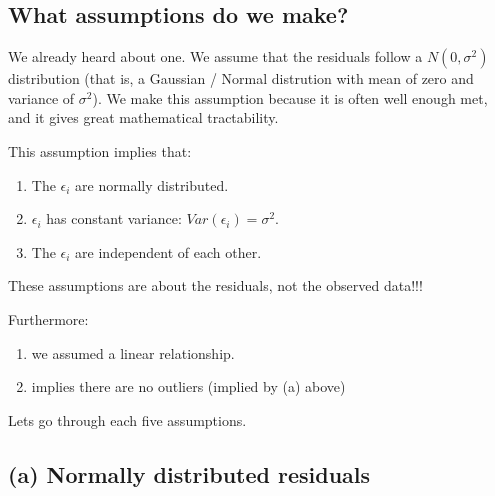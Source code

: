 \documentclass[
  letterpaper,
  8pt,
  a4paper]{book}
\providecommand{\tightlist}{%
  \setlength{\itemsep}{0pt}\setlength{\parskip}{0pt}}
\begin{document}
\subsection*{What assumptions do we
make?}\label{what-assumptions-do-we-make}

We already heard about one. We assume that the residuals follow a
\(N(0,\sigma^2)\) distribution (that is, a Gaussian / Normal distrution
with mean of zero and variance of \(\sigma^2\)). We make this assumption
because it is often well enough met, and it gives great mathematical
tractability.

This assumption implies that:

\begin{enumerate}
\def\labelenumi{(\alph{enumi})}
\tightlist
\item
  The \(\epsilon_i\) are normally distributed.
\item
  \(\epsilon_i\) has constant variance: \(Var(\epsilon_i)=\sigma^2\).
\item
  The \(\epsilon_i\) are independent of each other.
\end{enumerate}

\begin{tcolorbox}[enhanced jigsaw, arc=.35mm, bottomrule=.15mm, bottomtitle=1mm, breakable, colback=white, colbacktitle=quarto-callout-note-color!10!white, colframe=quarto-callout-note-color-frame, coltitle=black, left=2mm, leftrule=.75mm, opacityback=0, opacitybacktitle=0.6, rightrule=.15mm, title=\textcolor{quarto-callout-note-color}{\faInfo}\hspace{0.5em}{Note}, titlerule=0mm, toprule=.15mm, toptitle=1mm]

These assumptions are about the residuals, not the observed data!!!

\end{tcolorbox}

Furthermore:

\begin{enumerate}
\def\labelenumi{(\alph{enumi})}
\setcounter{enumi}{3}
\tightlist
\item
  we assumed a linear relationship.
\item
  implies there are no outliers (implied by (a) above)
\end{enumerate}

Lets go through each five assumptions.

\subsection*{(a) Normally distributed
residuals}\label{a-normally-distributed-residuals}
\end{document}

